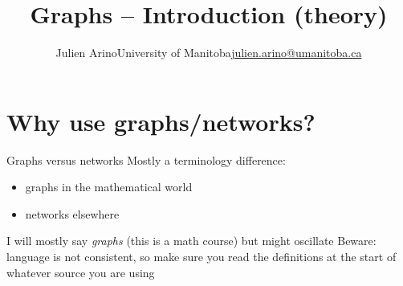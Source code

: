\documentclass[aspectratio=169]{beamer}\usepackage[]{graphicx}\usepackage[]{xcolor}
\title{Graphs -- Introduction (theory)}
\author{\texorpdfstring{Julien Arino\newline University of Manitoba\newline\url{julien.arino@umanitoba.ca}}{Julien Arino}}
\date{}
\begin{document}


\section{Why use graphs/networks?}


\begin{frame}{Graphs versus networks}
	Mostly a terminology difference:
	\begin{itemize}
	\item graphs in the mathematical world
	\item networks elsewhere
	\end{itemize}
	\vfill
	I will mostly say \emph{graphs} (this is a math course) but might oscillate
	\vfill
	Beware: language is not consistent, so make sure you read the definitions at the start of whatever source you are using
\end{frame}
\end{document}
